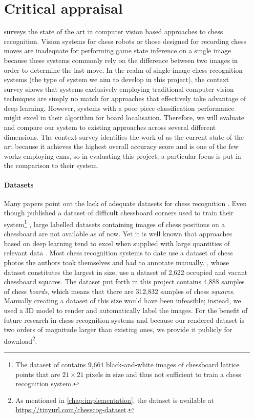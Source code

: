 \documentclass[../main.tex]{subfiles}
\begin{document}
\section{Critical appraisal}
 surveys the state of the art in computer vision based approaches to chess recognition. 
Vision systems for chess robots or those designed for recording chess moves are inadequate for performing game state inference on a single image because these systems commonly rely on the difference between two images in order to determine the last move.
In the realm of single-image chess recognition systems (the type of system we aim to develop in this project), the context survey shows that systems exclusively employing traditional computer vision techniques are simply no match for approaches that effectively take advantage of deep learning.
However, systems with a poor piece classification performance might excel in their algorithm for board localisation.
Therefore, we will evaluate and compare our system to existing approaches across several different dimensions.
The context survey identifies the work of \textcite{mehta2020} as the current state of the art because it achieves the highest overall accuracy score and is one of the few works employing \glspl{cnn}, so in evaluating this project, a particular focus is put in the comparison to their system.

\paragraph{Datasets}
Many papers point out the lack of adequate datasets for chess recognition \cite{czyzewski2020,ding2016,mehta2020}.
Even though \citeauthor{czyzewski2018} published a dataset \cite{czyzewski2018} of difficult chessboard corners used to train their system\footnote{The dataset of \citeauthor{czyzewski2018} contains 9,664 black-and-white images of chessboard lattice points that are $21\times 21$ pixels in size and thus not sufficient to train a chess recognition system.} \cite{czyzewski2020}, large labelled datasets containing images of chess positions on a chessboard are not available as of now.
Yet it is well known that approaches based on deep learning tend to excel when supplied with large quantities of relevant data \cite{halevy2009}.
Most chess recognition systems to date use a dataset of chess photos the authors took themselves and had to annotate manually.
\Textcite{mehta2020}, whose dataset constitutes the largest in size, use a dataset of 2,622 occupied and vacant chessboard squares.
The dataset put forth in this project contains 4,888 samples of chess \emph{boards}, which means that there are 312,832 samples of chess \emph{squares}.
Manually creating a dataset of this size would have been infeasible; instead, we used a 3D model to render and automatically label the images.
For the benefit of future research in chess recognition systems and because our rendered dataset is two orders of magnitude larger than existing ones, we provide it publicly for download\footnote{As mentioned in \cref{chap:implementation}, the dataset is available at \url{https://tinyurl.com/chesscog-dataset}.}.
\end{document}

